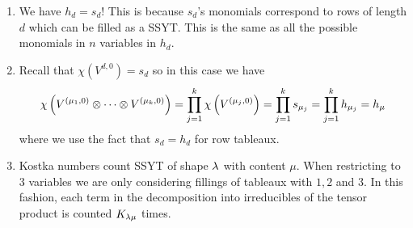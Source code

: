 \documentclass[12pt]{memoir}
\begin{document}
\begin{ptcbr}
    \begin{enumerate}
        \item We have $h_d=s_d$! This is because $s_d$'s monomials correspond to rows of length $d$ which can be filled as a SSYT. This is the same as all the possible monomials in $n$ variables in $h_d$.
        \item Recall that $\chi(V^{d,0})=s_d$ so in this case we have 
        $$\chi\left(V^{(\mu_1,0)}\otimes\cdots\otimes V^{(\mu_k,0)}\right)=\prod_{j=1}^{k}\chi\left(V^{(\mu_j,0)}\right)=\prod_{j=1}^{k}s_{\mu_j}=\prod_{j=1}^{k}h_{\mu_j}=h_\mu$$
        where we use the fact that $s_d=h_d$ for row tableaux.
        \item Kostka numbers count SSYT of shape $\lambda$ with content $\mu$. When restricting to 3 variables we are only considering fillings of tableaux with $1,2$ and $3$. In this fashion, each term in the decomposition into irreducibles of the tensor product is counted $K_{\lambda\mu}$ times.
    \end{enumerate}
\end{ptcbr}
\end{document}
